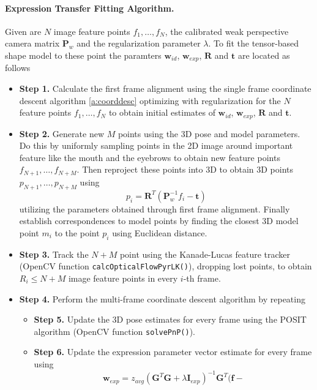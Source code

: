 \documentclass[11pt,a4paper]{report}
\begin{document}
\paragraph{Expression Transfer Fitting Algorithm. } \label{s:fit}Given are $N$ image feature points $f_1, \ldots ,f_N$, the
calibrated weak perspective camera matrix $\mathbf{P}_w$ and the regularization
parameter $\lambda$. To fit the
tensor-based shape model to these point the paramters $\mathbf{w}_{id}$,
$\mathbf{w}_{exp}$, $\mathbf{R}$ and $\mathbf{t}$ are located as follows
\begin{itemize}
\item \textbf{Step 1.} Calculate the first frame alignment using the single
  frame coordinate descent algorithm \ref{a:coorddesc} optimizing with
  regularization for the $N$ feature
  points $f_1, \ldots ,f_N$ to obtain initial estimates of $\mathbf{w}_{id}$,
$\mathbf{w}_{exp}$, $\mathbf{R}$ and $\mathbf{t}$.
\item \textbf{Step 2.} Generate new $M$ points using the 3D pose and model
  parameters. Do this by uniformly sampling points in the 2D image around important
  feature like the mouth and the eyebrows to obtain new feature points $f_{N+1},
  \ldots, f_{N+M}$. Then reproject these points into 3D to obtain 3D points $p_{N+1},
  \ldots, p_{N+M}$ using 
\begin{equation*}
p_i = \mathbf{R}^T(\mathbf{P}_w^{-1}f_i - \mathbf{t})
\end{equation*}
utilizing the parameters obtained through first frame alignment. Finally
establish correspondences to model points by finding the closest 3D model point
$m_i$ to the point $p_i$ using Euclidean distance.
\item \textbf{Step 3.} Track the $N+M$ point using the Kanade-Lucas feature
  tracker (OpenCV function \texttt{calcOpticalFlowPyrLK()}), dropping lost points, to obtain $R_i \le N+M$ image feature
  points in every $i$-th frame.
\item \textbf{Step 4.} Perform the multi-frame coordinate descent algorithm by repeating
\begin{itemize}
\item[\textbullet] \textbf{Step 5.} Update the 3D pose estimates for every frame
  using the POSIT algorithm (OpenCV function \texttt{solvePnP()}).
\item[\textbullet] \textbf{Step 6.} Update the expression parameter vector
  estimate for every frame using 
\begin{equation*}
\mathbf{w}_{exp} =z_{avg}(\mathbf{G}^T\mathbf{G} + \lambda\mathbf{I}_{exp})^{-1}\mathbf{G}^T\bigl(\mathbf{f} -

\end{equation*}
\end{itemize}
\end{itemize}
\end{document}
